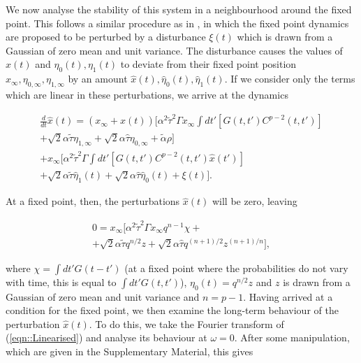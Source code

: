 \documentclass[sigconf]{aamas}
\newcommand{\talpha}{\tilde{\alpha}}
\newcommand{\ttau}{\tilde{\tau}}
\newcommand{\htau}{\hat{\tau}}
\newcommand{\xfixed}{x_\infty}
\newcommand{\ezerof}{\eta_{0, \infty}}
\newcommand{\eonef}{\eta_{1, \infty}}
\newcommand{\xpert}{\hat{x}(t)}
\newcommand{\xpertdash}{\hat{x}(t')}
\newcommand{\ezeropert}{\hat{\eta}_0(t)}
\newcommand{\eonepert}{\hat{\eta}_1(t)}
\begin{document}
We now analyse the stability of this system in a neighbourhood around the fixed point. This follows a similar procedure as in \cite{Opper1992}, in which the fixed point dynamics are proposed to be perturbed by a disturbance $\xi(t)$ which is drawn from a Gaussian of zero mean and unit variance. The disturbance causes the values of $x(t)$ and $\eta_0(t), \eta_1(t)$ to deviate from their fixed point position $\xfixed, \ezerof, \eonef$ by an amount $\xpert, \ezeropert, \eonepert$.
If we consider only the terms which are linear in these perturbations, we arrive at the dynamics

\begin{equation}
\label{eqn::Linearised}
    \begin{split}
        \frac{d}{dt} \xpert = (\xfixed + \xpert) [ \alpha^2 \ttau^2 \Gamma \xfixed \int dt' [ G(t, t')C^{p - 2}(t, t') ]\\ + \sqrt{2} \alpha \ttau \eonef + \sqrt{2} \alpha \htau \ezerof + \talpha \rho] \\
        + \xfixed [\alpha^2 \ttau^2 \Gamma \int dt' [ G(t, t')C^{p - 2}(t, t') \xpertdash ] \\ + \sqrt{2} \alpha \ttau \eonepert + \sqrt{2} \alpha \htau \ezeropert + \xi(t)].
    \end{split}
\end{equation}

At a fixed point, then, the perturbations $\xpert$ will be zero, leaving

\begin{equation}
    \begin{split}
    \label{eqn::fixed_point}
        0 = \xfixed [ \alpha^2 \ttau^2 \Gamma \xfixed q^{n-1} \chi + \\ + \sqrt{2} \alpha \ttau q^{n/2}z + \sqrt{2} \alpha \htau q^{(n+1)/2} z^{(n+1)/n}],
    \end{split}
\end{equation}

where $\chi = \int dt' G(t - t')$ (at a fixed point where the probabilities do not vary with time, this is equal to $\int dt' G(t, t')$), $\eta_0(t) = q^{n/2}z$ and $z$ is drawn from a Gaussian of zero mean and unit variance and $n = p - 1$. Having arrived at a condition for the fixed point, we then examine the long-term behaviour of the perturbation $\xpert$. To do this, we take the Fourier transform of (\ref{eqn::Linearised}) and analyse its behaviour at $\omega = 0$. After some manipulation, which are given in the Supplementary Material, this gives
\end{document}
